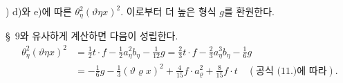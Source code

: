 
) d)와 e)에 따른 $\theta_\eta^2(\vartheta\eta x)^2$. 이로부터 더 높은 형식 $g$를 환원한다.

\S\ 9와 유사하게 계산하면 다음이 성립한다.
\[
\begin{aligned}
\theta_\eta^2(\vartheta\eta x)^2
&=\frac12t\cdot f-\frac12a_\eta^2b_\eta-\frac1{12}g=\frac23t\cdot f-\frac23a_\eta^3b_\eta-\frac16g\\
&=-\frac16g-\frac13(\vartheta\varrho x)^2+\frac4{15}f\cdot a_\varrho^2+\frac8{15}f\cdot t\quad(\text{공식 (11.)에 따라}).
\end{aligned}
\]
